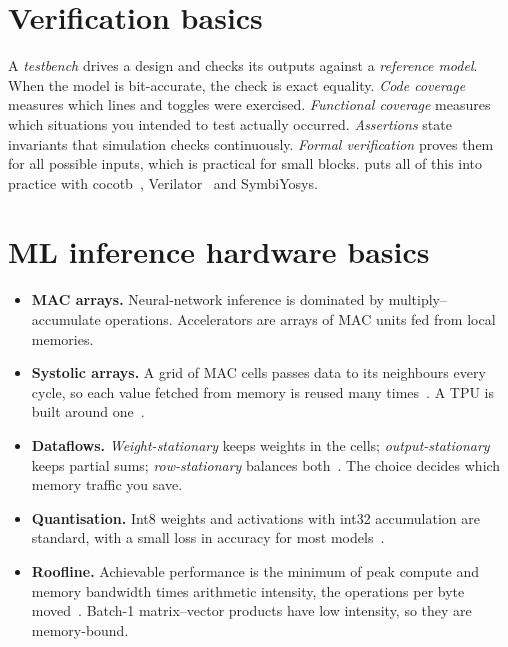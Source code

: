 \section{Verification basics}\label{sec:primer:verif}

A \emph{testbench} drives a design and checks its outputs against a
\emph{reference model}. When the model is bit-accurate, the check is exact
equality. \emph{Code coverage} measures which lines and toggles were exercised.
\emph{Functional coverage} measures which situations you intended to test
actually occurred. \emph{Assertions} state invariants that simulation checks
continuously. \emph{Formal verification} proves them for all possible inputs,
which is practical for small blocks.  puts all of this
into practice with cocotb~\cite{cocotb}, Verilator~\cite{verilator} and
SymbiYosys.

\section{ML inference hardware basics}\label{sec:primer:ml}

\begin{itemize}
  \item \textbf{MAC arrays.} Neural-network inference is dominated by
        multiply--accumulate operations. Accelerators are arrays of MAC units
        fed from local memories.
  \item \textbf{Systolic arrays.} A grid of MAC cells passes data to its
        neighbours every cycle, so each value fetched from memory is reused many
        times~\cite{kung1982systolic}. A TPU is built around
        one~\cite{jouppi2017tpu}.
  \item \textbf{Dataflows.} \emph{Weight-stationary} keeps weights in the cells;
        \emph{output-stationary} keeps partial sums; \emph{row-stationary}
        balances both~\cite{chen2017eyeriss}. The choice decides which memory
        traffic you save.
  \item \textbf{Quantisation.} Int8 weights and activations with int32
        accumulation are standard, with a small loss in accuracy for most
        models~\cite{jacob2018quantization}.
  \item \textbf{Roofline.} Achievable performance is the minimum of peak
        compute and memory bandwidth times arithmetic intensity, the operations
        per byte moved~\cite{williams2009roofline}. Batch-1 matrix--vector
        products have low intensity, so they are memory-bound.
\end{itemize}

